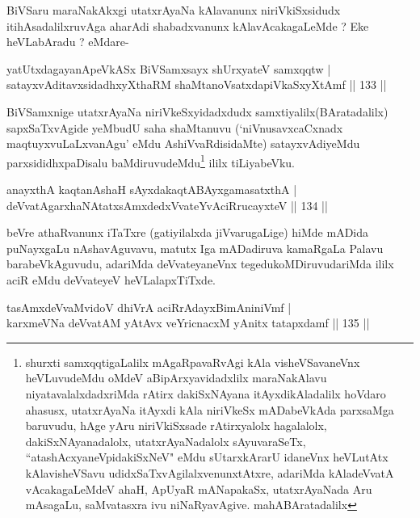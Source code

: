 \begin{artha}
BiVSaru maraNakAkxgi utatxrAyaNa kAlavanunx niriVkiSxsidudx
itihAsadalilxruvAga aharAdi shabadxvanunx kAlavAcakagaLeMde ? Eke heVLabAradu ? eMdare-
\end{artha}

\begin{shl}
yatUtxdagayanApeVkASx BiVSamxsayx shUrxyateV samxqqtw | \\
satayxvAditavxsidadhxyXthaRM shaMtanoVsatxdapiVkaSxyXtAmf \hfill|| 133 || 
\end{shl}

\begin{artha}
BiVSamxnige utatxrAyaNa niriVkeSxyidadxdudx samxtiyalilx(BAratadalilx) sapxSaTxvAgide yeMbudU saha shaMtanuvu (`niVnusavxcaCxnadx maqtuyxvuLaLxvanAgu' eMdu AshiVvaRdisidaMte) satayxvAdiyeMdu parxsididhxpaDisalu baMdiruvudeMdu\footnote{shurxti  samxqqtigaLalilx mAgaRpavaRvAgi kAla visheVSavaneVnx heVLuvudeMdu oMdeV  aBipArxyavidadxlilx maraNakAlavu niyatavalalxdadxriMda rAtirx dakiSxNAyana itAyxdikAladalilx hoVdaro ahasusx, utatxrAyaNa itAyxdi  kAla niriVkeSx mADabeVkAda parxsaMga baruvudu, hAge yAru  niriVkiSxsade  rAtirxyalolx hagalalolx, dakiSxNAyanadalolx,  utatxrAyaNadalolx sAyuvaraSeTx, ``atashAcxyaneV\s pidakiSxNeV" eMdu  sUtarxkArarU idaneVnx heVLutAtx kAlavisheVSavu  udidxSaTxvAgilalxvenunxtAtxre, adariMda kAladeVvatA vAcakagaLeMdeV  ahaH, ApUyaR mANapakaSx, utatxrAyaNada Aru mAsagaLu, saMvatasxra ivu  niNaRyavAgive. mahABAratadalilx} ililx tiLiyabeVku.
\end{artha}

\begin{shl}
anayxthA kaqtanAshaH sAyxdakaqtABAyxgamasatxthA | \\
deVvatAgarxhaNAtatxsAmxdedxVvateYvAciRrucayxteV \hfill|| 134 || 
\end{shl}

\begin{artha}
beVre athaRvanunx iTaTxre (gatiyilalxda jiVvarugaLige) hiMde mADida
puNayxgaLu nAshavAguvavu, matutx Iga mADadiruva kamaRgaLa Palavu
barabeVkAguvudu, adariMda deVvateyaneVnx tegedukoMDiruvudariMda ililx
aciR eMdu deVvateyeV heVLalapxTiTxde.
\end{artha}


\begin{shl}
tasAmxdeVvaMvidoV dhiVrA aciRrAdayxBimAniniVmf | \\
karxmeVNa deVvatAM yAtAvx veYricnacxM yAnitx tatapxdamf \hfill|| 135 || 
\end{shl}

